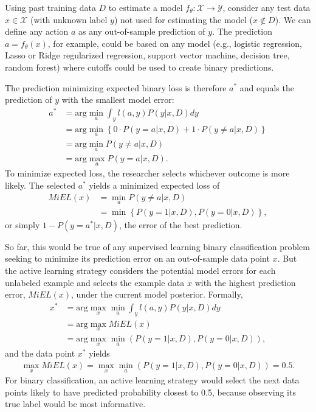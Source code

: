 \documentclass[nonblindrev]{informs3}
\begin{document}
Using past training data $D$ to estimate a model $f_\theta: \mathcal{X} \to \mathcal{Y}$, consider any test data $x \in \mathcal{X}$ (with unknown label $y$) not used for estimating the model ($x \notin D$). We can define any action $a$ as any out-of-sample prediction of $y$. The prediction $a=f_\theta(x)$, for example, could be based on any model (e.g., logistic regression, Lasso or Ridge regularized regression, support vector machine, decision tree, random forest) where cutoffs could be used to create binary predictions. 

The prediction minimizing expected binary loss is therefore $a^{*}$ and equals the prediction of $y$ with the smallest model error:
\begin{align}
a^{*} &= \text{arg} \min_{a} \int_y l(a,y) P(y|x,D) dy  \\
& = \text{arg} \min_{a} \left\{ 0 \cdot P(y=a|x,D) + 1 \cdot P(y \neq a|x,D) \right\}  \\
&= \text{arg} \min_{a} P(y \neq a|x,D) \\
&= \text{arg} \max_{a} P(y = a|x,D) .
\end{align}
To minimize expected loss, the researcher selects whichever outcome is more likely. The selected $a^{*}$ yields a minimized expected loss of
\begin{align}
 MiEL(x) &= \min_{a} P(y \neq a|x,D) \\
 &= \min \left\{ P(y=1|x,D), P(y=0|x,D) \right\},
\end{align}
or simply $1 - P(y = a^{*}|x,D)$, the error of the best prediction. 

So far, this would be true of any supervised learning binary classification problem seeking to minimize its prediction error on an out-of-sample data point $x$. But the active learning strategy considers the potential model errors for each unlabeled example and selects the example data $x$ with the highest prediction error, $MiEL(x)$, under the current model posterior. Formally,
\begin{align}
x^{*}  &= \text{arg} \max_{x} \min_{a} \int_y l(a,y) P(y|x,D) dy \\
&= \text{arg} \max_{x} MiEL(x) \\
& =  \text{arg} \max_{x} \min_{a} \left( P(y=1|x,D), P(y=0|x,D) \right),
\end{align}
and the data point $x^{*}$ yields
\begin{align}
\max_{x} MiEL(x) = \max_{x} \min_{a} \left( P(y=1|x,D), P(y=0|x,D) \right) = 0.5 .
\end{align}
For binary classification, an active learning strategy would select the next data points likely to have predicted probability closest to 0.5, because observing its true label would be most informative.
\end{document}
